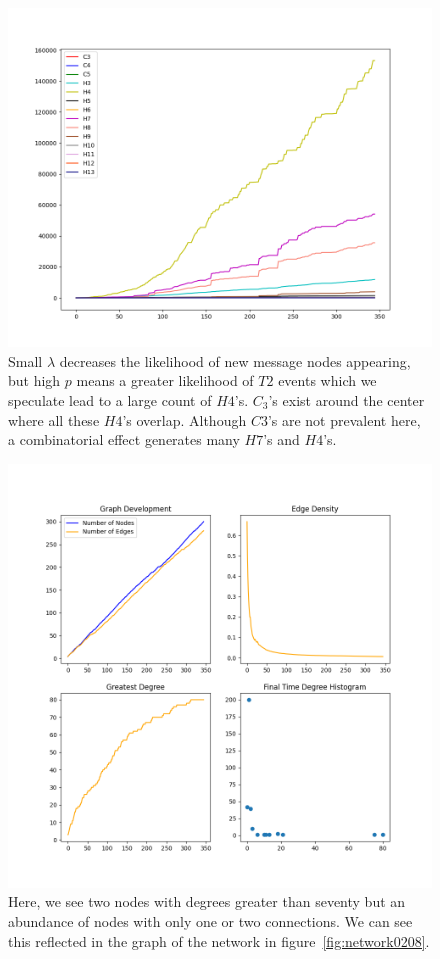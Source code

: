 \begin{figure}[h!]
    \includegraphics[width=16cm]{Images/twitter_sim_for_stats_3_0.2_0.8.png}
    \centering
    \caption{Small $\lambda$ decreases the likelihood of new message nodes appearing, but 
    high $p$ means a greater likelihood of $T2$ events which we speculate lead to a large
    count of $H4$'s. $C_3$'s exist around the center where all these $H4$'s
    overlap. Although $C3$'s are not prevalent here, a combinatorial effect generates 
    many $H7$'s and $H4$'s.}
    \label{fig:thij0208}
\end{figure}


\begin{figure}[h!]
    \includegraphics[width=14cm]{Images/twitter_sim_stats_3_0.2_0.8.png}
    \centering
    \caption{Here, we see two nodes with degrees greater than seventy
    but an abundance of nodes with only one or two connections. We can see this 
    reflected in the graph of the network in figure~\ref{fig:network0208}. }
    \label{fig:twittersim28}
\end{figure}


